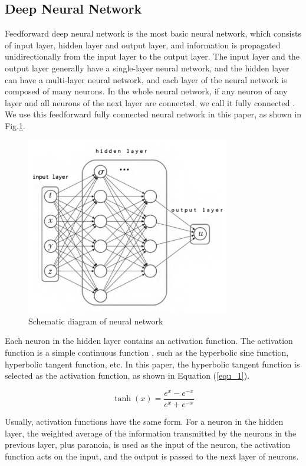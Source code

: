 \documentclass[10pt,journal,compsoc]{IEEEtran}
\begin{document}
\subsection{Deep Neural Network}
Feedforward deep neural network is the most basic neural network, which consists of input layer, hidden layer and output layer, and information is propagated unidirectionally from the input layer to the output layer. The input layer and the output layer generally have a single-layer neural network, and the hidden layer can have a multi-layer neural network, and each layer of the neural network is composed of many neurons. In the whole neural network, if any neuron of any layer and all neurons of the next layer are connected, we call it fully connected \cite{ruder2016}. We use this feedforward fully connected neural network in this paper, as shown in Fig.\ref{fig_1}.



\begin{figure}[!t]
\centering
\includegraphics[width=3.5in]{figure/fig1.jpg}
\caption{Schematic diagram of neural network}
\label{fig_1}
\end{figure}

Each neuron in the hidden layer contains an activation function. The activation function is a simple continuous function \cite{ruder2016}, such as the hyperbolic sine function, hyperbolic tangent function, etc. In this paper, the hyperbolic tangent function is selected as the activation function, as shown in Equation (\ref{equ_1}).



\begin{equation}
\tanh{(x)} = \dfrac{e^{x}-e^{-x}}{e^{x}+e^{-x}}
\label{equ_1}
\end{equation}

Usually, activation functions have the same form. For a neuron in the hidden layer, the weighted average of the information transmitted by the neurons in the previous layer, plus paranoia, is used as the input of the neuron, the activation function acts on the input, and the output is passed to the next layer of neurons.
\end{document}
